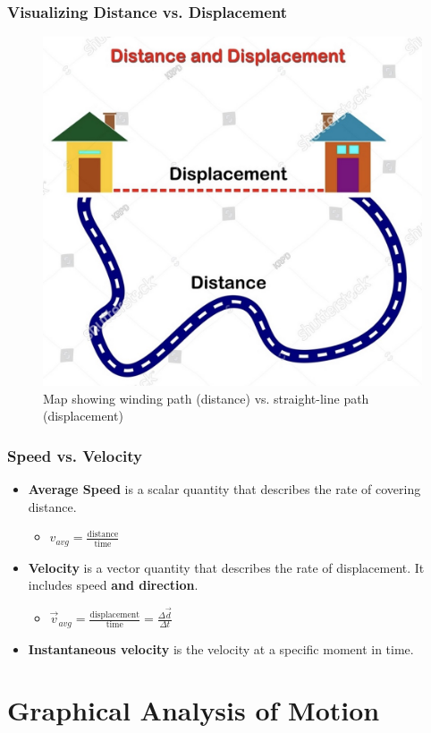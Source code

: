 \documentclass{beamer}
\begin{document}
\begin{frame}
\frametitle{Visualizing Distance vs. Displacement}
\begin{figure}
    \centering
    \includegraphics[width=0.5\linewidth]{phys11-distance-displacement-diagram.png}
    \caption{Map showing winding path (distance) vs. straight-line path (displacement)}
\end{figure}
\end{frame}

\begin{frame}
\frametitle{Speed vs. Velocity}
\begin{itemize}
    \item \textbf{Average Speed} is a \alert{scalar} quantity that describes the rate of covering distance.
    \pause
    \begin{itemize}
        \item $v_{avg} = \frac{\text{distance}}{\text{time}}$
    \end{itemize}
    \pause
    \item \textbf{Velocity} is a \alert{vector} quantity that describes the rate of displacement. It includes speed \textbf{and direction}.
    \pause
    \begin{itemize}
        \item $\vec{v}_{avg} = \frac{\text{displacement}}{\text{time}} = \frac{\Delta\vec{d}}{\Delta t}$
    \end{itemize}
    \pause
    \item \textbf{Instantaneous velocity} is the velocity at a specific moment in time.
\end{itemize}
\end{frame}

\section{Graphical Analysis of Motion}
\end{document}
